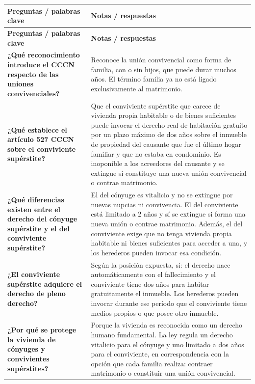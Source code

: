 \documentclass[12pt,oneside]{book}
\begin{document}
\begin{longtable}{
    >{\raggedright\arraybackslash}p{}
    >{\raggedright\arraybackslash}p{}
}
\toprule
\textbf{Preguntas / palabras clave} & \textbf{Notas / respuestas} \\
\midrule
\endfirsthead
\toprule
\textbf{Preguntas / palabras clave} & \textbf{Notas / respuestas} \\
\midrule
\endhead
\bottomrule
\endfoot

\textbf{¿Qué reconocimiento introduce el CCCN respecto de las uniones convivenciales?} &
Reconoce la unión convivencial como forma de familia, con o sin hijos, que puede durar muchos años. El término familia ya no está ligado exclusivamente al matrimonio. \\[0.8em]

\textbf{¿Qué establece el artículo 527 CCCN sobre el conviviente supérstite?} &
Que el conviviente supérstite que carece de vivienda propia habitable o de bienes suficientes puede invocar el derecho real de habitación gratuito por un plazo máximo de dos años sobre el inmueble de propiedad del causante que fue el último hogar familiar y que no estaba en condominio. Es inoponible a los acreedores del causante y se extingue si constituye una nueva unión convivencial o contrae matrimonio. \\[0.8em]

\textbf{¿Qué diferencias existen entre el derecho del cónyuge supérstite y el del conviviente supérstite?} &
El del cónyuge es vitalicio y no se extingue por nuevas nupcias ni convivencia. El del conviviente está limitado a 2 años y sí se extingue si forma una nueva unión o contrae matrimonio. Además, el del conviviente exige que no tenga vivienda propia habitable ni bienes suficientes para acceder a una, y los herederos pueden invocar esa condición. \\[0.8em]

\textbf{¿El conviviente supérstite adquiere el derecho de pleno derecho?} &
Según la posición expuesta, sí: el derecho nace automáticamente con el fallecimiento y el conviviente tiene dos años para habitar gratuitamente el inmueble. Los herederos pueden invocar durante ese período que el conviviente tiene medios propios o que posee otro inmueble. \\[0.8em]

\textbf{¿Por qué se protege la vivienda de cónyuges y convivientes supérstites?} &
Porque la vivienda es reconocida como un derecho humano fundamental. La ley regula un derecho vitalicio para el cónyuge y uno limitado a dos años para el conviviente, en correspondencia con la opción que cada familia realiza: contraer matrimonio o constituir una unión convivencial. \\


\end{longtable}
\end{document}
